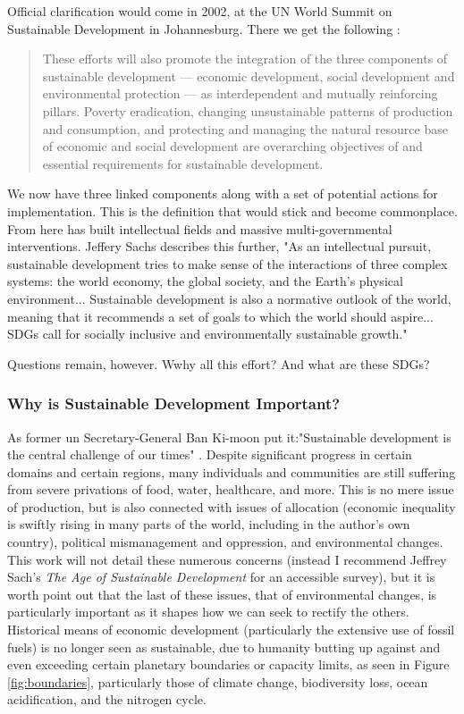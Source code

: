 Official clarification would come in 2002, at the UN World Summit on Sustainable Development in Johannesburg. There we get the following \cite{worldsummitonsustainabledevelopmentPlanImplementationWorld2002}:

\blockquote{These efforts will also promote the integration of the three components of sustainable development — economic development, social development and environmental protection — as interdependent and mutually reinforcing pillars. Poverty eradication, changing unsustainable patterns of production and
consumption, and protecting and managing the natural resource base of economic and social development are overarching objectives of and essential requirements for sustainable development.}

We now have three linked components along with a set of potential actions for implementation. This is the definition that would stick and become commonplace. From here has built intellectual fields and massive multi-governmental interventions. Jeffery Sachs describes this further, "As an intellectual pursuit, sustainable development tries to make sense of the interactions of three complex systems: the world economy, the global society, and the Earth's physical environment... Sustainable development is also a normative outlook of the world, meaning that it recommends a set of goals to which the world should aspire... SDGs call for socially inclusive and environmentally sustainable growth." \cite{sachsAgeSustainableDevelopment2015}

Questions remain, however. Wwhy all this effort? And what are these SDGs?

\subsubsection{Why is Sustainable Development Important?}

As former \ac{un} Secretary-General Ban Ki-moon put it:"Sustainable development is the central challenge of our times" \cite{sachsAgeSustainableDevelopment2015}. Despite significant progress in certain domains and certain regions, many individuals and communities are still suffering from severe privations of food, water, healthcare, and more. This is no mere issue of production, but is also connected with issues of allocation (economic inequality is swiftly rising in many parts of the world, including in the author's own country), political mismanagement and oppression, and environmental changes. This work will not detail these numerous concerns (instead I recommend Jeffrey Sach's \textit{The Age of Sustainable Development} for an accessible survey), but it is worth point out that the last of these issues, that of environmental changes, is particularly important as it shapes how we can seek to rectify the others. Historical means of economic development (particularly the extensive use of fossil fuels) is no longer seen as sustainable, due to humanity butting up against and even exceeding certain planetary boundaries or capacity limits, as seen in Figure \ref{fig:boundaries}, particularly those of climate change, biodiversity loss, ocean acidification, and the nitrogen cycle.

